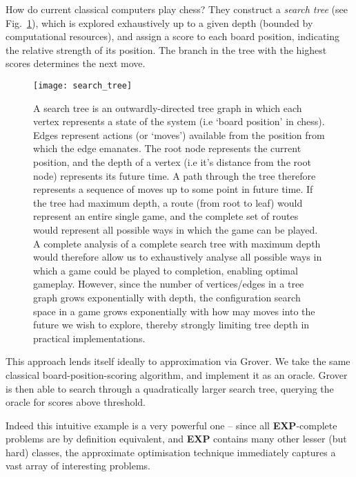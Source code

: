 How do current classical computers play chess? They construct a \textit{search tree} (see Fig.~\ref{fig:search_tree}), which is explored exhaustively up to a given depth (bounded by computational resources), and assign a score to each board position, indicating the relative strength of its position. The branch in the tree with the highest scores determines the next move.

\begin{figure}[!htb]
	\texttt{[image: search\_tree]}
	\caption{A search tree is an outwardly-directed tree graph in which each vertex represents a state of the system (i.e `board position' in chess). Edges represent actions (or `moves') available from the position from which the edge emanates. The root node represents the current position, and the depth of a vertex (i.e it's distance from the root node) represents its future time. A path through the tree therefore represents a sequence of moves up to some point in future time. If the tree had maximum depth, a route (from root to leaf) would represent an entire single game, and the complete set of routes would represent all possible ways in which the game can be played. A complete analysis of a complete search tree with maximum depth would therefore allow us to exhaustively analyse all possible ways in which a game could be played to completion, enabling optimal gameplay. However, since the number of vertices/edges in a tree graph grows exponentially with depth, the configuration search space in a game grows exponentially with how may moves into the future we wish to explore, thereby strongly limiting tree depth in practical implementations.}\label{fig:search_tree}
\end{figure}

This approach lends itself ideally to approximation via Grover. We take the same classical board-position-scoring algorithm, and implement it as an oracle. Grover is then able to search through a quadratically larger search tree, querying the oracle for scores above threshold.

Indeed this intuitive example is a very powerful one -- since all \textbf{EXP}-complete problems are by definition equivalent, and \textbf{EXP} contains many other lesser (but hard) classes, the approximate optimisation technique immediately captures a vast array of interesting problems.


